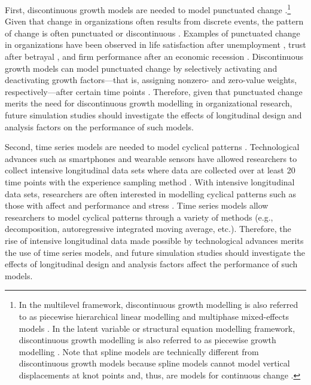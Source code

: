\documentclass[
12pt, %
twoside,
english]{guelphthesis}
\begin{document}
First, discontinuous growth models are needed to model punctuated change \autocite{bliese2016,bliese2020}.\footnote{In the multilevel framework, discontinuous growth modelling is also referred to as piecewise hierarchical linear modelling \parencite{raudenbush2002} and multiphase mixed-effects models \parencite{cudeck2002}. In the latent variable or structural equation modelling framework, discontinuous growth modelling is also referred to as piecewise growth modelling \parencites{chou2004}{kohli2013}. Note that spline models are technically different from discontinuous growth models because spline models cannot model vertical displacements at knot points and, thus, are models for continuous change \parencite[for a review, see][]{edwards2017}.} Given that change in organizations often results from discrete events, the pattern of change is often punctuated or discontinuous \autocite{morgeson2015}. Examples of punctuated change in organizations have been observed in life satisfaction after unemployment \autocite{lucas2004}, trust after betrayal \autocite{fulmer2015}, and firm performance after an economic recession \autocites{kim2014b}[for more examples, see][]{bliese2016}. Discontinuous growth models can model punctuated change by selectively activating and deactivating growth factors---that is, assigning nonzero- and zero-value weights, respectively---after certain time points \autocite{bliese2016}. Therefore, given that punctuated change merits the need for discontinuous growth modelling in organizational research, future simulation studies should investigate the effects of longitudinal design and analysis factors on the performance of such models.

Second, time series models are needed to model cyclical patterns \autocite{pickup2014}. Technological advances such as smartphones and wearable sensors have allowed researchers to collect intensive longitudinal data sets where data are collected over at least 20 time points \autocite{collins2006} with the experience sampling method \autocite{larson2014}. With intensive longitudinal data sets, researchers are often interested in modelling cyclical patterns such as those with affect and performance \autocite{dalal2014} and stress \autocite{fuller2003}. Time series models allow researchers to model cyclical patterns through a variety of methods (e.g., decomposition, autoregressive integrated moving average, etc.). Therefore, the rise of intensive longitudinal data made possible by technological advances merits the use of time series models, and future simulation studies should investigate the effects of longitudinal design and analysis factors affect the performance of such models.
\end{document}
